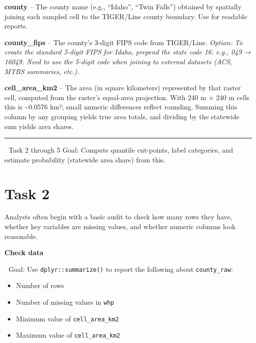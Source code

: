\documentclass[
  12pt,
]{scrreprt}
\providecommand{\tightlist}{%
  \setlength{\itemsep}{0pt}\setlength{\parskip}{0pt}}
\begin{document}
\textbf{county} -- The county name (e.g., ``Idaho'', ``Twin Falls'') obtained by spatially joining each sampled cell to the TIGER/Line county boundary. Use for readable reports.

\textbf{county\_fips} -- The county's 3-digit FIPS code from TIGER/Line. \emph{Option: To create the standard 5-digit FIPS for Idaho, prepend the state code 16: e.g., 049 → 16049. Need to use the 5-digit code when joining to external datasets (ACS, MTBS summaries, etc.).}

\textbf{cell\_area\_km2} -- The area (in square kilometers) represented by that raster cell, computed from the raster's equal-area projection. With 240 m × 240 m cells this is \textasciitilde0.0576 km²; small numeric differences reflect rounding. Summing this column by any grouping yields true area totals, and dividing by the statewide sum yields area shares.

\begin{center}\rule{0.5\linewidth}{0.5pt}\end{center}

🎯 Task 2 through 5 Goal: Compute quantile cut-points, label categories, and estimate probability (statewide area share) from this.

\section{Task 2}\label{task-2}

Analysts often begin with a basic audit to check how many rows they have, whether key variables are missing values, and whether numeric columns look reasonable.

\textbf{Check data}

🎯 Goal: Use \texttt{dplyr::summarize()} to report the following about \texttt{county\_raw}:

\begin{itemize}
\tightlist
\item
  Number of rows
\item
  Number of missing values in \texttt{whp}
\item
  Minimum value of \texttt{cell\_area\_km2}
\item
  Maximum value of \texttt{cell\_area\_km2}
\end{itemize}
\end{document}

